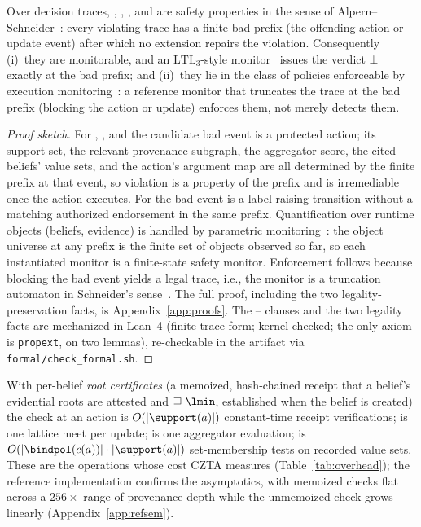 \begin{proposition}
\label{prop:safety}
Over decision traces, \Ione, \Itwo, \Ithree, and \Ifour{} are safety
properties in the sense of Alpern--Schneider~\cite{alpern}: every
violating trace has a finite bad prefix (the offending action or
update event) after which no extension repairs the violation.
Consequently (i)~they are monitorable, and an
$\mathrm{LTL}_3$-style monitor~\cite{bauer,pnueli} issues the
verdict $\bot$ exactly at the bad prefix; and (ii)~they lie in
the class of policies enforceable by execution
monitoring~\cite{schneider}: a reference monitor that truncates
the trace at the bad prefix (blocking the action or
update) enforces them, not merely detects them.
\end{proposition}

\begin{proof}[Proof sketch]
For \Ione, \Ithree, and \Ifour{} the candidate bad event is a protected
action; its support set, the relevant provenance subgraph, the
aggregator score, the cited beliefs' value sets, and the action's
argument map are all determined by the finite prefix at that event, so
violation is a property of the prefix and is irremediable once the
action executes. For \Itwo{} the bad event is a label-raising
transition without a matching authorized endorsement in the same
prefix. Quantification over runtime objects (beliefs, evidence) is
handled by parametric monitoring~\cite{mop}: the object universe at
any prefix is the finite set of objects observed so far, so each
instantiated monitor is a finite-state safety monitor. Enforcement
follows because blocking the bad event yields a legal trace, i.e., the
monitor is a truncation automaton in Schneider's
sense~\cite{schneider}. The full proof, including the two
legality-preservation facts, is Appendix~\ref{app:proofs}. The
\Ione--\Ifour{} clauses and the two legality facts are mechanized in
Lean~4 (finite-trace form; kernel-checked; the only axiom is
\texttt{propext}, on two lemmas), re-checkable in the artifact via
\texttt{formal/check\_formal.sh}.
\end{proof}

\begin{remark}
With per-belief \emph{root certificates} (a memoized, hash-chained
receipt that a belief's evidential roots are attested and
$\sqsupseteq \lmin$, established when the belief is created) the
\Ione{} check at an action is $O(|\support(a)|)$ constant-time receipt
verifications; \Itwo{} is one lattice meet per update; \Ithree{} is one
aggregator evaluation; \Ifour{} is $O(|\bindpol(c(a))| \cdot
|\support(a)|)$ set-membership tests on recorded value sets. These are
the operations whose cost CZTA measures (Table~\ref{tab:overhead}); the
reference implementation confirms the asymptotics, with memoized
\Ione{} checks flat across a $256\times$ range of provenance depth
while the unmemoized check grows linearly
(Appendix~\ref{app:refsem}).
\end{remark}

